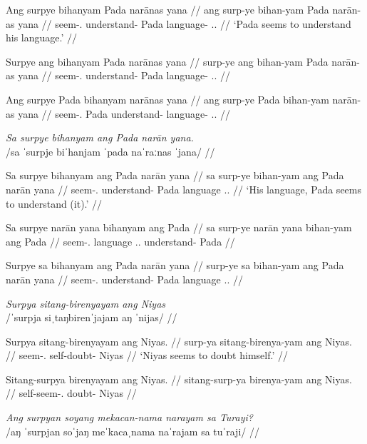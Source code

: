 \documentclass[12pt,a4paper]{scrartcl}
\newcommand{\TsgM}{{\Tsg}.{\M}}
\newcommand{\TsgF}{{\Tsg}.{\F}}
\begin{document}
\gla Ang surpye bihanyam Pada narānas yana //
\glb ang surp-ye bihan-yam Pada narān-as yana //
\glc \AgtT{} seem-\TsgF{} understand-\Ptcp{} Pada language-\Parg{} \TsgM{}.\Gen{} //
\glft `Pada seems to understand his language.' //
\endgl

\a\ljudge*\begingl
\gla Surpye ang bihanyam Pada narānas yana //
\glb surp-ye ang bihan-yam Pada narān-as yana //
\glc seem-\TsgF{} \AgtT{} understand-\Ptcp{} Pada language-\Parg{} \TsgM{}.\Gen{} //
\endgl

\a\ljudge*\begingl
\gla Ang surpye Pada bihanyam narānas yana //
\glb ang surp-ye Pada bihan-yam narān-as yana //
\glc \AgtT{} seem-\TsgF{} Pada understand-\Ptcp{} language-\Parg{} \TsgM{}.\Gen{} //
\endgl
\xe

\pex
\a\begingl
\glpreamble \textit{Sa surpye bihanyam ang Pada narān yana.} \\
	/sa ˈsurpje biˈhanjam ˈpada naˈraːnas ˈjana/ //

\gla Sa surpye bihanyam ang Pada narān yana //
\glb sa surp-ye bihan-yam ang Pada narān yana //
\glc \PatT{} seem-\TsgF{} understand-\Ptcp{} \Aarg{} Pada language \TsgM{}.\Gen{} //
\glft `His language, Pada seems to understand (it).' //
\endgl

\a\ljudge*\begingl
\gla Sa surpye narān yana bihanyam ang Pada //
\glb sa surp-ye narān yana bihan-yam ang Pada //
\glc \PatT{} seem-\TsgF{} language \TsgM{}.\Gen{} understand-\Ptcp{} \Aarg{} Pada //
\endgl

\a\ljudge*\begingl
\gla Surpye sa bihanyam ang Pada narān yana //
\glb surp-ye sa bihan-yam ang Pada narān yana //
\glc seem-\TsgF{} \PatT{} understand-\Ptcp{} \Aarg{} Pada language \TsgM{}.\Gen{} //
\endgl
\xe

\pex
\a\begingl
\glpreamble \textit{Surpya sitang-birenyayam ang Niyas} \\
	/ˈsurpja siˌtaŋbirenˈjajam aŋ ˈnijas/ //

\gla Surpya sitang-birenyayam ang Niyas. //
\glb surp-ya sitang-birenya-yam ang Niyas. //
\glc seem-\TsgM{} self-doubt-\Ptcp{} \Aarg{} Niyas //
\glft `Niyas seems to doubt himself.' //
\endgl

\a\ljudge*\begingl
\gla Sitang-surpya birenyayam ang Niyas. //
\glb sitang-surp-ya birenya-yam ang Niyas. //
\glc self-seem-\TsgM{} doubt-\Ptcp{} \Aarg{} Niyas //
\endgl
\xe

\ex\begingl
\glpreamble \textit{Ang surpyan soyang mekacan-nama narayam sa Turayi?} \\
	/aŋ ˈsurpjan soˈjaŋ meˈkacaˌnama naˈrajam sa tuˈraji/ //
\end{document}
